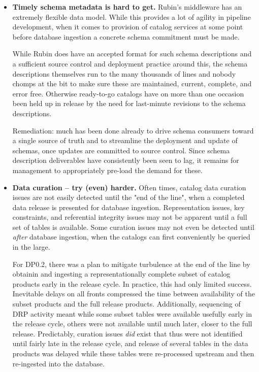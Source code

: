 \begin{itemize}

\item
  \textbf{Timely schema metadata is hard to get.}  Rubin's middleware has an extremely flexible data
  model.  While this provides a lot of agility in pipeline development, when it comes to provision of
  catalog services at some point before database ingestion a concrete schema commitment must be made.

  While Rubin does have an accepted format for such schema descriptions and a sufficient source control and
  deployment practice around this, the schema descriptions themselves run to the many thousands of lines and
  nobody chomps at the bit to make sure these are maintained, current, complete, and error free.  Otherwise
  ready-to-go catalogs have on more than one occasion been held up in release by the need for last-minute
  revisions to the schema descriptions.

  Remediation: much has been done already to drive schema consumers toward a single source of truth and to
  streamline the deployment and update of schemas, once updates are committed to source control.  Since
  schema description deliverables have consistently been seen to lag, it remains for management to
  appropriately pre-load the demand for these.

\item
  \textbf{Data curation -- try (even) harder.}  Often times, catalog data curation issues are not easily
  detected until the "end of the line", when a completed data release is presented for database ingestion.
  Representation issues, key constraints, and referential integrity issues may not be apparent until a full
  set of tables is available.  Some curation issues may not even be detected until \emph{after} database
  ingestion, when the catalogs can first conveniently be queried in the large.

  For DP0.2, there was a plan to mitigate turbulence at the end of the line by obtainin and ingesting a
  representationally complete subset of catalog products early in the release cycle.  In practice, this had
  only limited success.  Inevitable delays on all fronts compressed the time between availability of the
  subset products and the full release products.  Additionally, sequencing of DRP activity meant while some
  subset tables were available usefully early in the release cycle, others were not available until much
  later, closer to the full release.  Predictably, curation issues \emph{did} exist that thus were not
  identified until fairly late in the release cycle, and release of several tables in the data products was
  delayed while these tables were re-processed upstream and then re-ingested into the database.


\end{itemize}

